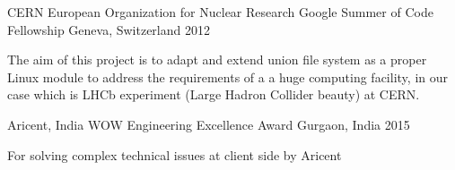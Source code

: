 
\begin{cventries}
  \cventry
    {CERN European Organization for Nuclear Research}
    {Google Summer of Code Fellowship}
    {Geneva, Switzerland}
    {2012}
    {
      \begin{cvitems}
      \item { The aim of this project is to adapt and extend union file system as a proper Linux module to address the requirements of a a huge computing facility, in our case which is LHCb experiment (Large Hadron Collider beauty) at CERN.}
      \end{cvitems}
    }

  \cventry
    {Aricent, India}
    {WOW Engineering Excellence Award}
    {Gurgaon, India}
    {2015}
    {
      \begin{cvitems}
        \item {For solving complex technical issues at client side by Aricent}
      \end{cvitems}
    }

\end{cventries}
